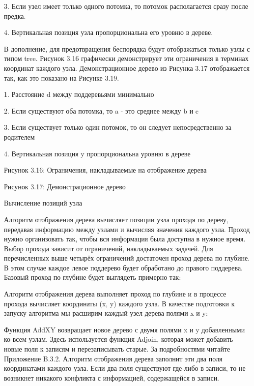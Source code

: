 3. Если узел имеет только одного потомка, то потомок располагается сразу после предка.

4. Вертикальная позиция узла пропорциональна его уровню в дереве.

В дополнение, для предотвращения беспорядка будут отображаться только узлы с типом tree. Рисунок 3.16 графически демонстрирует эти ограничения в терминах координат каждого узла. Демонстрационное дерево из Рисунка 3.17 отображается так, как это показано на Рисунке 3.19.

1. Расстояние d между поддеревьями минимально

2. Если существуют оба потомка, то a - это среднее между b и c

3. Если существует только один потомок, то он следует непосредственно за родителем

4. Вертикальная позиция y пропорциональна уровню в дереве

Рисунок 3.16: Ограничения, накладываемые на отображение дерева

Рисунок 3.17: Демонстрационное дерево

Вычисление позиций узла

Алгоритм отображения дерева вычисляет позиции узла проходя по дереву, передавая информацию между узлами и вычисляя значения каждого узла. Проход нужно организовать так, чтобы вся информация была доступна в нужное время. Выбор прохода зависит от ограничений, накладываемых задачей. Для перечисленных выше четырёх ограничений достаточен проход дерева по глубине. В этом случае каждое левое поддерево будет обработано до правого поддерева. Базовый проход по глубине будет выглядеть примерно так:

Алгоритм отображения дерева выполняет проход по глубине и в процессе прохода вычисляет координаты (x, y) каждого узла. В качестве подготовки к запуску алгоритма мы расширим каждый узел дерева полями x и y:

Функция AddXY возвращает новое дерево с двумя полями x и y добавленными ко всем узлам. Здесь используется функция Adjoin, которая может добавить новые поля к записям и перезаписывать старые. За подробностями читайте Приложение B.3.2. Алгоритм отображения дерева заполнит эти два поля координатами каждого узла. Если два поля существуют где-либо в записи, то не возникнет никакого конфликта с информацией, содержащейся в записи.

